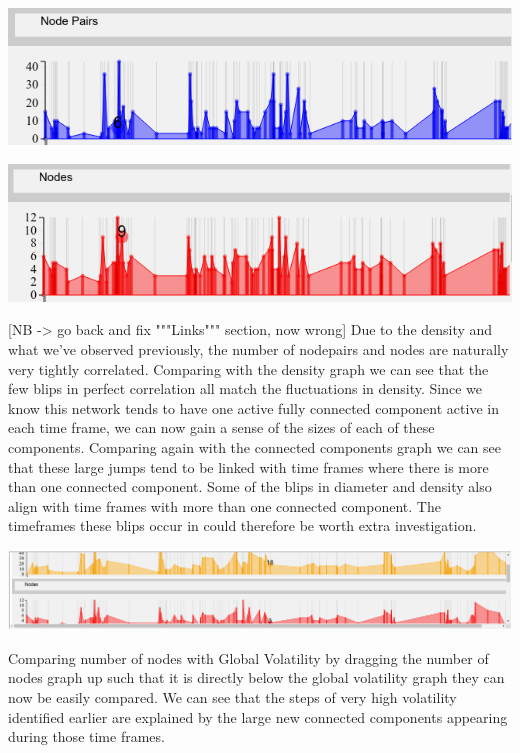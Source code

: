 \begin{center}
\includegraphics[trim={0 0 0 0}, width=140mm]{./Figures/TurinNodePairs.png}
\end{center}    
\begin{center}
\includegraphics[trim={0 0 0 0}, width=140mm]{./Figures/TurinNodes.png}
\end{center}    
[NB -> go back and fix """Links""" section, now wrong]
Due to the density and what we've observed previously, the number of nodepairs and nodes are naturally very tightly correlated. Comparing with the density graph we can see that the few blips in perfect correlation all match the fluctuations in density. Since we know this network tends to have one active fully connected component active in each time frame, we can now gain a sense of the sizes of each of these components. Comparing again with the connected components graph we can see that these large jumps tend to be linked with time frames where there is more than one connected component. Some of the blips in diameter and density also align with time frames with more than one connected component. The timeframes these blips occur in could therefore be worth extra investigation.
    
\begin{center}
\includegraphics[trim={0 0 0 0}, width=140mm]{./Figures/TurinGlobalVolatilityAndNodes.png}
\end{center}        

Comparing number of nodes with Global Volatility by dragging the number of nodes graph up such that it is directly below the global volatility graph they can now be easily compared. We can see that the steps of very high volatility identified earlier are explained by the large new connected components appearing during those time frames.
   
